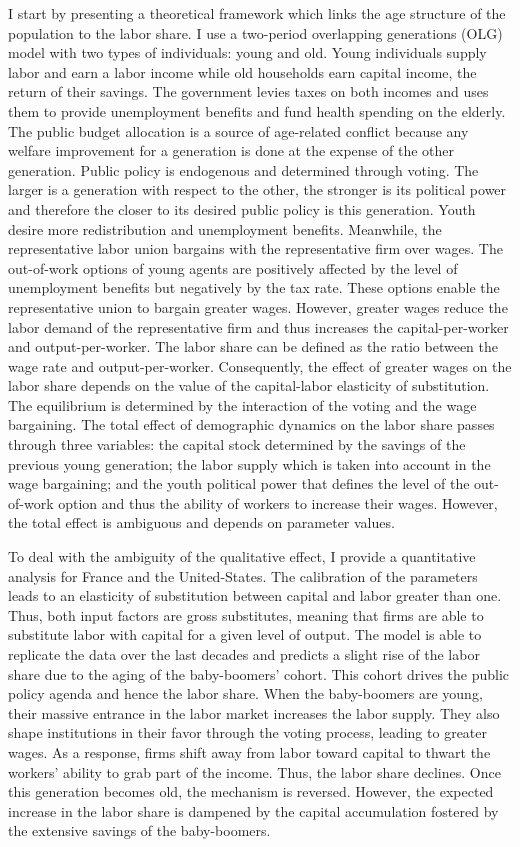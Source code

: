 \documentclass[
]{article}
\begin{document}
I start by presenting a theoretical framework which links the age structure of the population to the labor share. I use a two-period overlapping generations (OLG) model with two types of individuals: young and old. Young individuals supply labor and earn a labor income while old households earn capital income, the return of their savings.
The government levies taxes on both incomes and uses them to provide unemployment benefits and fund health spending on the elderly. The public budget allocation is a source of age-related conflict because any welfare improvement for a generation is done at the expense of the other generation. Public policy is endogenous and determined through voting. The larger is a generation with respect to the other, the stronger is its political power and therefore the closer to its desired public policy is this generation. Youth desire more redistribution and unemployment benefits.
Meanwhile, the representative labor union bargains with the representative firm over wages. The out-of-work options of young agents are positively affected by the level of unemployment benefits but negatively by the tax rate. These options enable the representative union to bargain greater wages. However, greater wages reduce the labor demand of the representative firm and thus increases the capital-per-worker and output-per-worker. The labor share can be defined as the ratio between the wage rate and output-per-worker. Consequently, the effect of greater wages on the labor share depends on the value of the capital-labor elasticity of substitution.
The equilibrium is determined by the interaction of the voting and the wage bargaining. The total effect of demographic dynamics on the labor share passes through three variables: the capital stock determined by the savings of the previous young generation; the labor supply which is taken into account in the wage bargaining; and the youth political power that defines the level of the out-of-work option and thus the ability of workers to increase their wages. However, the total effect is ambiguous and depends on parameter values.

To deal with the ambiguity of the qualitative effect, I provide a quantitative analysis for France and the United-States. The calibration of the parameters leads to an elasticity of substitution between capital and labor greater than one. Thus, both input factors are gross substitutes, meaning that firms are able to substitute labor with capital for a given level of output. The model is able to replicate the data over the last decades and predicts a slight rise of the labor share due to the aging of the baby-boomers' cohort. This cohort drives the public policy agenda and hence the labor share. When the baby-boomers are young, their massive entrance in the labor market increases the labor supply. They also shape institutions in their favor through the voting process, leading to greater wages. As a response, firms shift away from labor toward capital to thwart the workers' ability to grab part of the income. Thus, the labor share declines. Once this generation becomes old, the mechanism is reversed. However, the expected increase in the labor share is dampened by the capital accumulation fostered by the extensive savings of the baby-boomers.
\end{document}
